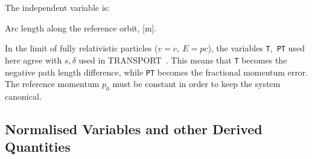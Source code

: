 The independent variable is:
 
\begin{mylist}
Arc length along the reference orbit, [m].
\end{mylist}
 
\par In the limit of fully relativistic particles (\(v=c,\ E=pc\)),
the variables {\tt T},~{\tt PT} used here agree with \(s, \delta\)
used in TRANSPORT~\cite{B-BRO80}.
This means that {\tt T} becomes the negative path length difference,
while {\tt PT} becomes the fractional momentum error.
The reference momentum \(p_0\) must be constant
in order to keep the system canonical.
 
\subsection{Normalised Variables and other Derived Quantities}
\label{S-NORM}
 
